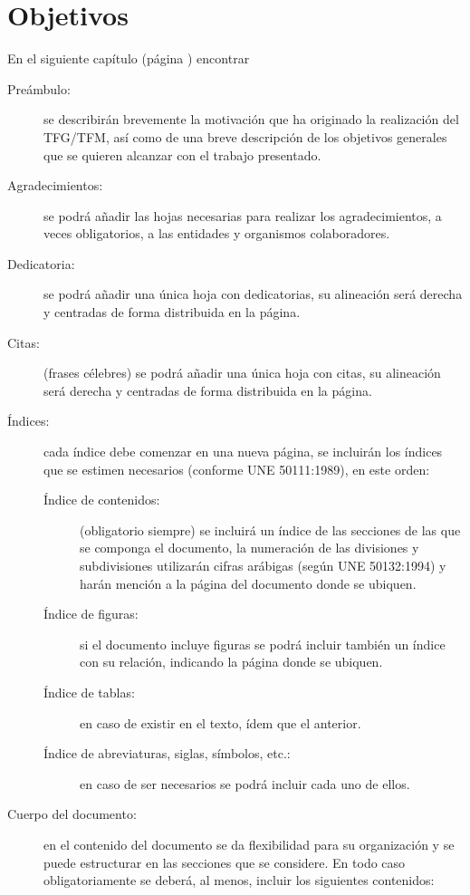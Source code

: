 \chapter{Objetivos}




En el siguiente capítulo (página \pageref{marcoteorico}) encontrar


\begin{description}
\item[Preámbulo:] se describirán brevemente la motivación que ha originado la realización del TFG/TFM, así como de una breve descripción de los objetivos generales que se quieren alcanzar con el trabajo presentado.
\item[Agradecimientos:] se podrá añadir las hojas necesarias para realizar los agradecimientos, a veces obligatorios, a las entidades y organismos colaboradores.
\item[Dedicatoria:] se podrá añadir una única hoja con dedicatorias, su alineación será derecha y centradas de forma distribuida en la página.
\item[Citas:] (frases célebres) se podrá añadir una única hoja con citas, su alineación será derecha y centradas de forma distribuida en la página.
\item[Índices:] cada índice debe comenzar en una nueva página, se incluirán los índices que se estimen necesarios (conforme UNE 50111:1989), en este orden:
\begin{description}
\item[Índice de contenidos:] (obligatorio siempre) se incluirá un índice de las secciones de las que se componga el documento, la numeración de las 
divisiones y subdivisiones utilizarán cifras arábigas (según UNE 50132:1994) y harán mención a la página del documento donde se ubiquen.
\item[Índice de figuras:] si el documento incluye figuras se podrá incluir también un índice con su relación, indicando la página donde se ubiquen.
\item[Índice de tablas:] en caso de existir en el texto, ídem que el anterior.
\item[Índice de abreviaturas, siglas, símbolos, etc.:] en caso de ser necesarios se podrá incluir cada uno de ellos.
\end{description}
\item[Cuerpo del documento:] en el contenido del documento se da flexibilidad para su organización y se puede estructurar en las secciones que se considere. En todo caso obligatoriamente se deberá, al menos, incluir los siguientes contenidos:

\end{description}
